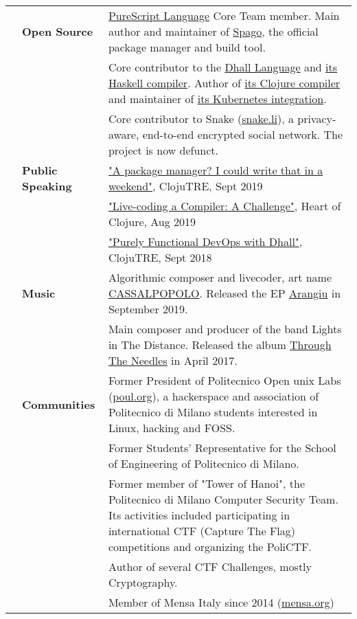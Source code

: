 \documentclass[a4paper,10pt]{article}
\newcommand{\vvv}{\vspace{4 mm}}
\begin{document}
\noindent
\large
\begin{tabularx}{\textwidth}{ C{0.0cm} L{3.25cm} *{1}{X}}
  & \textbf{Open Source}
    & \href{https://purescript.org}{PureScript Language} Core Team member. Main author and maintainer of \href{https://github.com/spacchetti/spago}{Spago}, the official package manager and build tool. \vvv\\
  & & Core contributor to the \href{https://github.com/dhall-lang/dhall-lang}{Dhall Language} and \href{https://github.com/dhall-lang/dhall-haskell}{its Haskell compiler}. Author of \href{https://github.com/f-f/dhall-clj}{its Clojure compiler} and maintainer of \href{https://github.com/dhall-lang/dhall-kubernetes}{its Kubernetes integration}. \vvv\\
  & & Core contributor to Snake (\href{https://snake.li}{snake.li}), a privacy-aware, end-to-end encrypted social network. The project is now defunct. \vvv\\

  & \textbf{Public Speaking}
  & \href{https://www.youtube.com/watch?v=kPuGS4_9mRc}{"A package manager? I could write that in a weekend"}, ClojuTRE, Sept 2019\vvv\\
  & & \href{https://www.youtube.com/watch?v=_lMltUNB6Yw}{"Live-coding a Compiler: A Challenge"}, Heart of Clojure, Aug 2019\vvv\\
  & & \href{https://www.youtube.com/watch?v=UHp6nEF5m2o}{"Purely Functional DevOps with Dhall"}, ClojuTRE, Sept 2018\vvv\\

  & \textbf{Music}
    & Algorithmic composer and livecoder, art name \href{https://github.com/f-f/CASSALPOPOLO}{CASSALPOPOLO}. Released the EP \href{https://soundcloud.com/cassalpopolo/sets/arangiu}{Arangiu} in September 2019. \vvv\\
  & & Main composer and producer of the band Lights in The Distance. Released the album \href{https://lightsinthedistance.bandcamp.com/releases}{Through The Needles} in April 2017. \vvv\\

  & \textbf{Communities}
    & Former President of Politecnico Open unix Labs (\href{https://poul.org}{poul.org}), a hackerspace and association of Politecnico di Milano students interested in Linux, hacking and FOSS. \vvv\\
  & & Former Students' Representative for the School of Engineering of Politecnico di Milano. \vvv\\
  & & Former member of "Tower of Hanoi", the Politecnico di Milano Computer Security Team. Its activities included participating in international CTF (Capture The Flag) competitions and organizing the PoliCTF.\\ & & Author of several CTF Challenges, mostly Cryptography. \vvv\\
  & & Member of Mensa Italy since 2014 (\href{https://mensa.org}{mensa.org}) \vvv\\
\end{tabularx}
\end{document}
